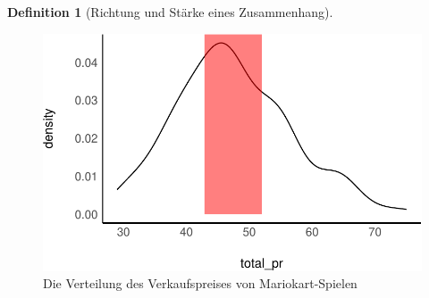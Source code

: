 \documentclass[
  a4paper,
  DIV=11]{scrreprt}
\theoremstyle{definition}
\theoremstyle{definition}
\theoremstyle{definition}
\newtheorem{definition}{Definition}[chapter]
\theoremstyle{remark}
\begin{document}
\begin{definition}[Richtung und Stärke eines
Zusammenhang]
\begin{figure}
\begin{minipage}{0.50\linewidth}
{\includegraphics{060-modellguete_files/figure-pdf/fig-var-1.pdf}

}


\end{minipage}%
%
\begin{minipage}{0.50\linewidth}



\end{minipage}%

\caption{\label{fig-var}Die Verteilung des Verkaufspreises von
Mariokart-Spielen}

\end{figure}%


\end{definition}
\end{document}
